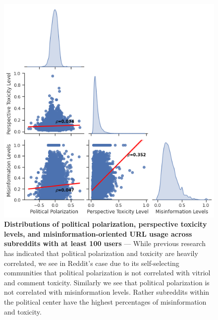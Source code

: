 \begin{figure}
\centering
\includegraphics[width=0.75\columnwidth]{figures/subreddit_distribution.png} 
\caption{\textbf{Distributions of political polarization, perspective toxicity levels, and misinformation-oriented URL usage across subreddits with at least 100 users }--- While previous research has indicated that political polarization and toxicity are heavily correlated, we see in Reddit's case due to its self-selecting communities that political polarization is not correlated with vitriol and comment toxicity. Similarly we see that political polarization is not correlated with misinformation levels. Rather subreddits within the political center have the highest percentages of misinformation and toxicity. 
}
\label{figure:misinfo-toxciity-polarization}
\end{figure}